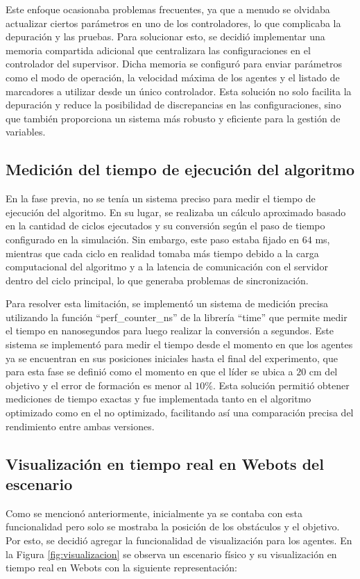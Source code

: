 Este enfoque ocasionaba problemas frecuentes, ya que a menudo se olvidaba actualizar ciertos parámetros en uno de los controladores, lo que complicaba la depuración y las pruebas. Para solucionar esto, se decidió implementar una memoria compartida adicional que centralizara las configuraciones en el controlador del supervisor. Dicha memoria se configuró para enviar parámetros como el modo de operación, la velocidad máxima de los agentes y el listado de marcadores a utilizar desde un único controlador. Esta solución no solo facilita la depuración y reduce la posibilidad de discrepancias en las configuraciones, sino que también proporciona un sistema más robusto y eficiente para la gestión de variables.

\subsection{Medición del tiempo de ejecución del algoritmo}
En la fase previa, no se tenía un sistema preciso para medir el tiempo de ejecución del algoritmo. En su lugar, se realizaba un cálculo aproximado basado en la cantidad de ciclos ejecutados y su conversión según el paso de tiempo configurado en la simulación. Sin embargo, este paso estaba fijado en $64$ ms, mientras que cada ciclo en realidad tomaba más tiempo debido a la carga computacional del algoritmo y a la latencia de comunicación con el servidor dentro del ciclo principal, lo que generaba problemas de sincronización. 

Para resolver esta limitación, se implementó un sistema de medición precisa utilizando la función ``perf\_counter\_ns'' de la librería ``time'' que permite medir el tiempo en nanosegundos para luego realizar la conversión a segundos. Este sistema se implementó para medir el tiempo desde el momento en que los agentes ya se encuentran en sus posiciones iniciales hasta el final del experimento, que para esta fase se definió como el momento en que el líder se ubica a $20$ cm del objetivo y el error de formación es menor al $10\%$. Esta solución permitió obtener mediciones de tiempo exactas y fue implementada tanto en el algoritmo optimizado como en el no optimizado, facilitando así una comparación precisa del rendimiento entre ambas versiones.

\subsection{Visualización en tiempo real en Webots del escenario}
Como se mencionó anteriormente, inicialmente ya se contaba con esta funcionalidad pero solo se mostraba la posición de los obstáculos y el objetivo. Por esto, se decidió agregar la funcionalidad de visualización para los agentes. En la Figura \ref{fig:visualizacion} se observa un escenario físico y su visualización en tiempo real en Webots con la siguiente representación:


